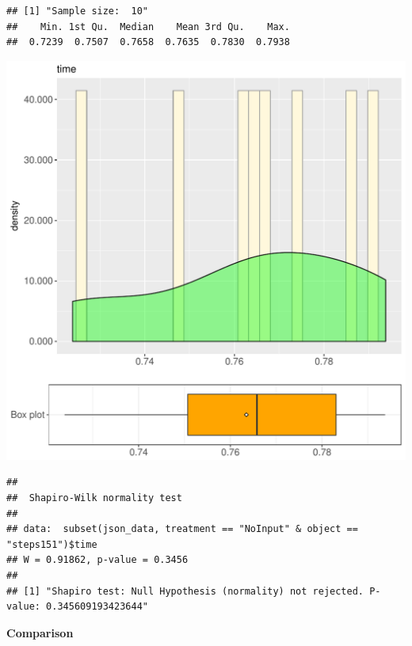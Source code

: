 \documentclass{article}\usepackage[]{graphicx}\usepackage[]{color}
\makeatletter
\def\maxwidth{ %
  \ifdim\Gin@nat@width>\linewidth
    \linewidth
  \else
    \Gin@nat@width
  \fi
}
\newenvironment{kframe}{%
 \def\at@end@of@kframe{}%
 \ifinner\ifhmode%
  \def\at@end@of@kframe{\end{minipage}}%
  \begin{minipage}{\columnwidth}%
 \fi\fi%
 \def\FrameCommand##1{\hskip\@totalleftmargin \hskip-\fboxsep
 \colorbox{shadecolor}{##1}\hskip-\fboxsep
     \hskip-\linewidth \hskip-\@totalleftmargin \hskip\columnwidth}%
 \MakeFramed {\advance\hsize-\width
   \@totalleftmargin\z@ \linewidth\hsize
   \@setminipage}}%
 {\par\unskip\endMakeFramed%
 \at@end@of@kframe}
\newenvironment{knitrout}{}{} %
\makeatother
\begin{document}
\begin{knitrout}
\color{fgcolor}\begin{kframe}
\begin{verbatim}
## [1] "Sample size:  10"
##    Min. 1st Qu.  Median    Mean 3rd Qu.    Max. 
##  0.7239  0.7507  0.7658  0.7635  0.7830  0.7938
\end{verbatim}
\end{kframe}
\includegraphics[width=\maxwidth]{figure/RH4_NoInput_steps151-1} 
\begin{kframe}\begin{verbatim}
## 
## 	Shapiro-Wilk normality test
## 
## data:  subset(json_data, treatment == "NoInput" & object == "steps151")$time
## W = 0.91862, p-value = 0.3456
## 
## [1] "Shapiro test: Null Hypothesis (normality) not rejected. P-value: 0.345609193423644"
\end{verbatim}
\end{kframe}
\end{knitrout}
  
 \textbf{Comparison}
  
\end{document}
